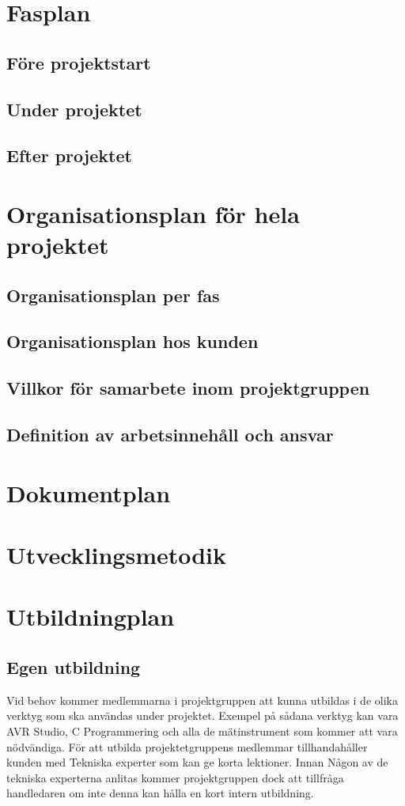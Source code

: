 \documentclass[a4paper,12pt]{article}
\begin{document}
\section{Fasplan}		
\subsection{Före projektstart}
\subsection{Under projektet}
\subsection{Efter projektet}


\section{Organisationsplan för hela projektet}	%
\subsection{Organisationsplan per fas}
\subsection{Organisationsplan hos kunden}
\subsection{Villkor för samarbete inom projektgruppen}
\subsection{Definition av arbetsinnehåll och ansvar}

\section{Dokumentplan}	%

\section{Utvecklingsmetodik}	%

\section{ Utbildningplan}	%
\subsection{Egen utbildning}
Vid behov kommer medlemmarna i projektgruppen att kunna utbildas i de olika verktyg som ska användas under projektet. Exempel på sådana verktyg kan vara AVR Studio, C Programmering och alla de mätinstrument som kommer att vara nödvändiga. För att utbilda projektetgruppens medlemmar tillhandahåller kunden med Tekniska experter som kan ge korta lektioner. Innan Någon av de tekniska experterna anlitas kommer projektgruppen dock att tillfråga handledaren om inte denna kan hålla en kort intern utbildning.
\end{document}
